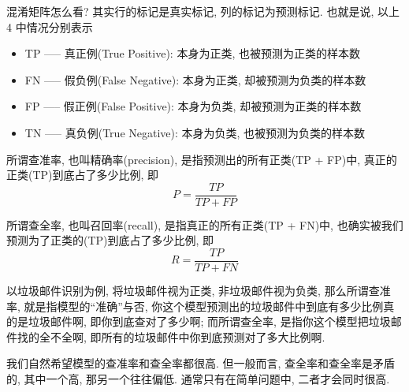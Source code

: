\documentclass[a4paper,UTF8]{ctexart}
\theoremstyle{plain} \newtheorem{theorem}{定理}[section]
\theoremstyle{plain} \newtheorem{definition}{定义}[section]
\theoremstyle{plain} \newtheorem{lemma}{引理}[section]
\theoremstyle{plain} \newtheorem{proposition}{命题}[section]
\theoremstyle{plain} \newtheorem{example}{例}[section]
\theoremstyle{plain} \newtheorem{remark}{注}[section]
\theoremstyle{plain} \newtheorem{corollary}{推论}[section]
\begin{document}
混淆矩阵怎么看? 其实行的标记是真实标记, 列的标记为预测标记. 也就是说, 以上 4 中情况分别表示
\begin{itemize}
\item TP ----- 真正例(True Positive): 本身为正类, 也被预测为正类的样本数

\item FN ----- 假负例(False Negative): 本身为正类, 却被预测为负类的样本数

\item FP ----- 假正例(False Positive): 本身为负类, 却被预测为正类的样本数

\item TN ----- 真负例(True Negative): 本身为负类, 也被预测为负类的样本数

\end{itemize}

所谓查准率, 也叫精确率(precision), 是指预测出的所有正类(TP + FP)中,  真正的正类(TP)到底占了多少比例, 即
\begin{equation}
P = \frac{TP}{TP + FP}
\end{equation}

所谓查全率, 也叫召回率(recall), 是指真正的所有正类(TP + FN)中, 也确实被我们预测为了正类的(TP)到底占了多少比例, 即
\begin{equation}
R = \frac{TP}{TP + FN}
\end{equation}

以垃圾邮件识别为例, 将垃圾邮件视为正类, 非垃圾邮件视为负类, 那么所谓查准率, 就是指模型的“准确”与否, 你这个模型预测出的垃圾邮件中到底有多少比例真的是垃圾邮件啊, 即你到底查对了多少啊; 而所谓查全率, 是指你这个模型把垃圾邮件找的全不全啊, 即所有的垃圾邮件中你到底预测对了多大比例啊. 

我们自然希望模型的查准率和查全率都很高. 但一般而言, 查全率和查全率是矛盾的, 其中一个高, 那另一个往往偏低. 通常只有在简单问题中, 二者才会同时很高.
\end{document}
